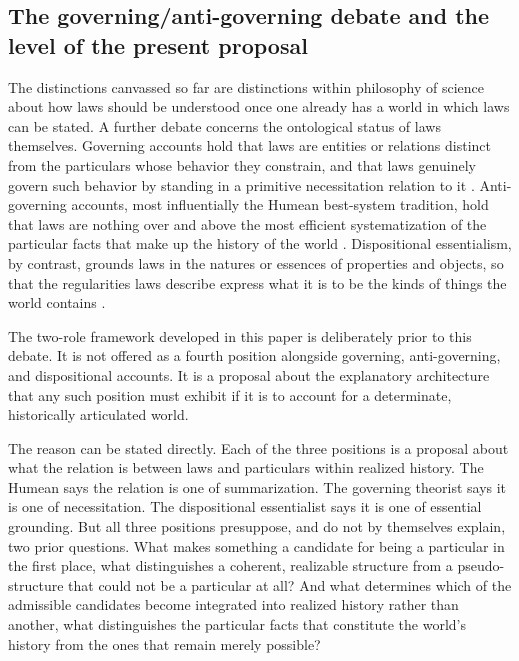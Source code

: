 \documentclass[11pt]{article}
\theoremstyle{foundation}
\begin{document}
\subsection{The governing/anti-governing debate and the level of the present proposal}

The distinctions canvassed so far are distinctions within philosophy of science about how laws should be understood once one already has a world in which laws can be stated. A further debate concerns the ontological status of laws themselves. Governing accounts hold that laws are entities or relations distinct from the particulars whose behavior they constrain, and that laws genuinely govern such behavior by standing in a primitive necessitation relation to it \citep{Armstrong1983,Dretske1977,Tooley1977,Maudlin2007}. Anti-governing accounts, most influentially the Humean best-system tradition, hold that laws are nothing over and above the most efficient systematization of the particular facts that make up the history of the world \citep{Lewis1986,Loewer1996,Hall2015}. Dispositional essentialism, by contrast, grounds laws in the natures or essences of properties and objects, so that the regularities laws describe express what it is to be the kinds of things the world contains \citep{Bird2007,Ellis2001,Mumford2004}.

The two-role framework developed in this paper is deliberately prior to this debate. It is not offered as a fourth position alongside governing, anti-governing, and dispositional accounts. It is a proposal about the explanatory architecture that any such position must exhibit if it is to account for a determinate, historically articulated world.

The reason can be stated directly. Each of the three positions is a proposal about what the relation is between laws and particulars within realized history. The Humean says the relation is one of summarization. The governing theorist says it is one of necessitation. The dispositional essentialist says it is one of essential grounding. But all three positions presuppose, and do not by themselves explain, two prior questions. What makes something a candidate for being a particular in the first place, what distinguishes a coherent, realizable structure from a pseudo-structure that could not be a particular at all? And what determines which of the admissible candidates become integrated into realized history rather than another, what distinguishes the particular facts that constitute the world's history from the ones that remain merely possible?
\end{document}
